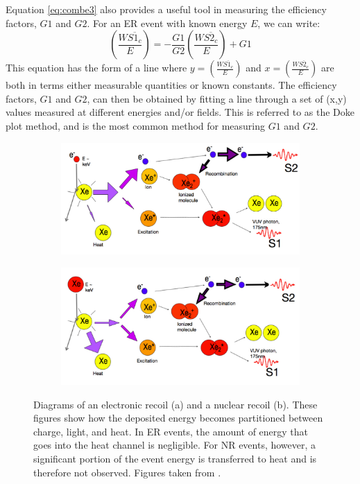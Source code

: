 Equation \ref{eq:combe3} also provides a useful tool in measuring the efficiency factors, $G1$ and $G2$. For an ER event with known energy $E$, we can write:
\begin{equation}
\left(\frac{W\overline{S1_c}}{E}\right)=-\frac{G1}{G2}\left(\frac{W\overline{S2_c}}{E}\right)+G1
\end{equation}
This equation has the form of a line where $y=\left(\frac{W\overline{S1_c}}{E}\right)$ and $x=\left(\frac{W\overline{S2_c}}{E}\right)$ are both in terms either measurable quantities or known constants. The efficiency factors, $G1$ and $G2$, can then be obtained by fitting a line through a set of (x,y) values measured at different energies and/or fields. This is referred to as the Doke plot method, and is the most common method for measuring $G1$ and $G2$\cite{doke2002}.

\begin{figure}[!h]
\centering
\begin{subfigure}{\linewidth}
\centering
\includegraphics[width=\linewidth]{Figures/ER_diagram.pdf}
\caption{}
\end{subfigure}
\begin{subfigure}{\linewidth}
\centering
\includegraphics[width=\linewidth]{Figures/NR_diagram.pdf}
\caption{}
\end{subfigure}
\caption{Diagrams of an electronic recoil (a) and a nuclear recoil (b). These figures show how the deposited energy becomes partitioned between charge, light, and heat. In ER events, the amount of energy that goes into the heat channel is negligible. For NR events, however, a significant portion of the event energy is transferred to heat and is therefore not observed. Figures taken from \cite{attila}.}
\label{fig:lux_layout} 
\end{figure}



